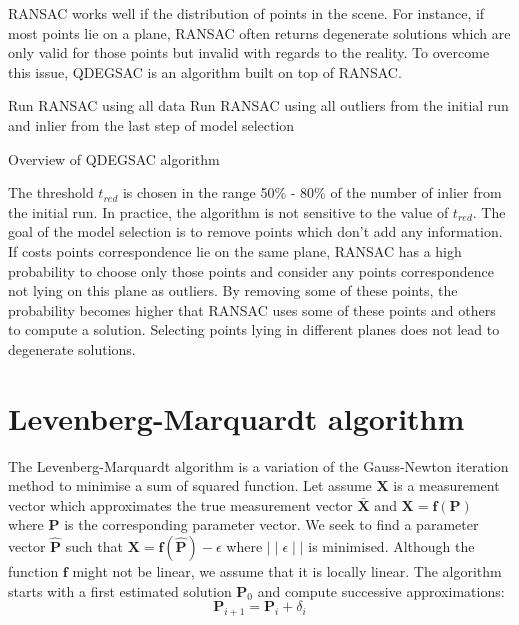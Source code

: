 \documentclass[11pt]{report}
\begin{document}
RANSAC works well if the distribution of points in the scene. For instance, if most points lie on a plane, RANSAC often returns degenerate solutions which are only valid for those points but invalid with regards to the reality. To overcome this issue, QDEGSAC\cite{Qdegsac06} is an algorithm built on top of RANSAC.

\begin{algorithm}[H]
  Run RANSAC using all data\;
  Run RANSAC using all outliers from the initial run and inlier from the last step of model selection\;
 \caption{Overview of QDEGSAC algorithm}
\end{algorithm}

The threshold $t_{red}$ is chosen in the range 50\% - 80\% of the number of inlier from the initial run. In practice, the algorithm is not sensitive to the value of $t_{red}$. The goal of the model selection is to remove points which don't add any information. If costs points correspondence lie on the same plane, RANSAC has a high probability to choose only those points and consider any points correspondence not lying on this plane as outliers. By removing some of these points, the probability becomes higher that RANSAC uses some of these points and others to compute a solution. Selecting points lying in different planes does not lead to degenerate solutions.

\section{Levenberg-Marquardt algorithm}

The Levenberg-Marquardt algorithm is a variation of the Gauss-Newton iteration method to minimise a sum of squared function. Let assume $\mathbf{X}$ is a measurement vector which approximates the true measurement vector $\bar{\mathbf{X}}$ and $\mathbf{X} = \mathbf{f}(\mathbf{P})$ where $\mathbf{P}$ is the corresponding parameter vector. We seek to find a parameter vector $\widehat{\mathbf{P}}$ such that $\mathbf{X} = \mathbf{f}(\widehat{\mathbf{P}}) - \epsilon$ where $\mid\mid\epsilon\mid\mid$ is minimised. Although the function $\mathbf{f}$ might not be linear, we assume that it is locally linear. The algorithm starts with a first estimated solution $\mathbf{P}_0$ and compute successive approximations:
\[
  \mathbf{P}_{i+1} = \mathbf{P}_i + \delta_i
\] 
\end{document}
